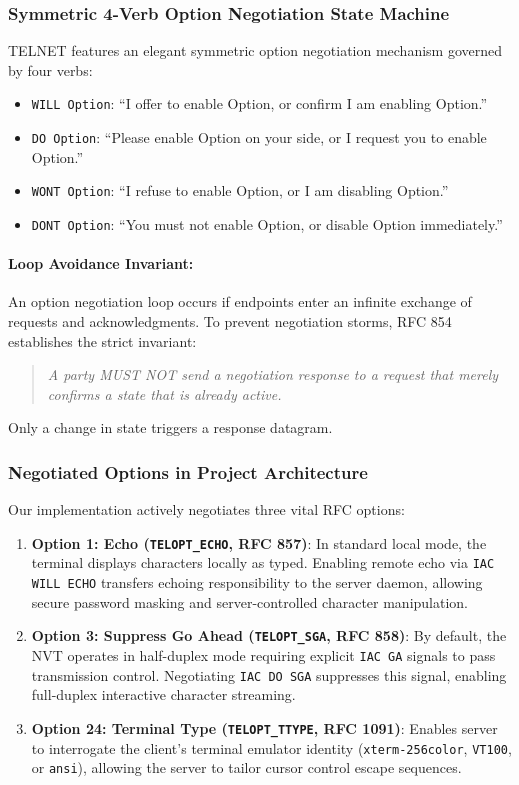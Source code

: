 \documentclass[12pt, a4paper]{article}
\begin{document}
\subsubsection{Symmetric 4-Verb Option Negotiation State Machine}
TELNET features an elegant symmetric option negotiation mechanism governed by four verbs:
\begin{itemize}
    \item \texttt{WILL Option}: ``I offer to enable Option, or confirm I am enabling Option.''
    \item \texttt{DO Option}: ``Please enable Option on your side, or I request you to enable Option.''
    \item \texttt{WONT Option}: ``I refuse to enable Option, or I am disabling Option.''
    \item \texttt{DONT Option}: ``You must not enable Option, or disable Option immediately.''
\end{itemize}

\paragraph{Loop Avoidance Invariant:}
An option negotiation loop occurs if endpoints enter an infinite exchange of requests and acknowledgments. To prevent negotiation storms, RFC 854 establishes the strict invariant:
\begin{quote}
\textit{A party MUST NOT send a negotiation response to a request that merely confirms a state that is already active.}
\end{quote}
Only a change in state triggers a response datagram.

\subsubsection{Negotiated Options in Project Architecture}
Our implementation actively negotiates three vital RFC options:
\begin{enumerate}
    \item \textbf{Option 1: Echo (\texttt{TELOPT\_ECHO}, RFC 857)}:
    In standard local mode, the terminal displays characters locally as typed. Enabling remote echo via \texttt{IAC WILL ECHO} transfers echoing responsibility to the server daemon, allowing secure password masking and server-controlled character manipulation.
    \item \textbf{Option 3: Suppress Go Ahead (\texttt{TELOPT\_SGA}, RFC 858)}:
    By default, the NVT operates in half-duplex mode requiring explicit \texttt{IAC GA} signals to pass transmission control. Negotiating \texttt{IAC DO SGA} suppresses this signal, enabling full-duplex interactive character streaming.
    \item \textbf{Option 24: Terminal Type (\texttt{TELOPT\_TTYPE}, RFC 1091)}:
    Enables server to interrogate the client's terminal emulator identity (\texttt{xterm-256color}, \texttt{VT100}, or \texttt{ansi}), allowing the server to tailor cursor control escape sequences.
\end{enumerate}
\end{document}
